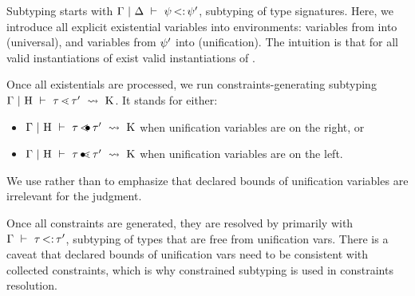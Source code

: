 
Subtyping starts with
$\Gamma~\vert~\Delta\ \vdash\ \psi \operatorname{<:} \psi'$, subtyping of type signatures.
Here, we introduce all explicit existential variables into environments:
variables from \tysig into \AEnv (universal), 
and variables from $\psi'$ into \UEnv (unification).
The intuition is that for all valid instantiations of \AEnv exist valid
instantiations of \UEnv.

Once all existentials are processed, we run constraints-generating
subtyping $\Gamma~\vert~\mathrm{H}\ \vdash\ \tau \operatorname{\lessdot} \tau'\ \rightsquigarrow\ \mathrm{K}$. It stands for either:
\begin{itemize}
    \item $\Gamma~\vert~\mathrm{H}\ \vdash\ \tau \operatorname{\lessdot\!\!\bullet} \tau'\ \rightsquigarrow\ \mathrm{K}$ when unification variables are on the right, or
    \item $\Gamma~\vert~\mathrm{H}\ \vdash\ \tau \operatorname{\bullet\!\!\lessdot} \tau'\ \rightsquigarrow\ \mathrm{K}$ when unification variables are on the left.
\end{itemize}
We use \UEnvD rather than \UEnv to emphasize that declared bounds of unification
variables are irrelevant for the judgment.

Once all constraints are generated, they are resolved by \solvectrdflt
primarily with $\Gamma\ \vdash\ \tau \operatorname{<:} \tau'$,
subtyping of types that are free from unification vars.
There is a caveat that declared bounds of unification vars need to be consistent
with collected constraints, which is why constrained subtyping is used
in constraints resolution.

